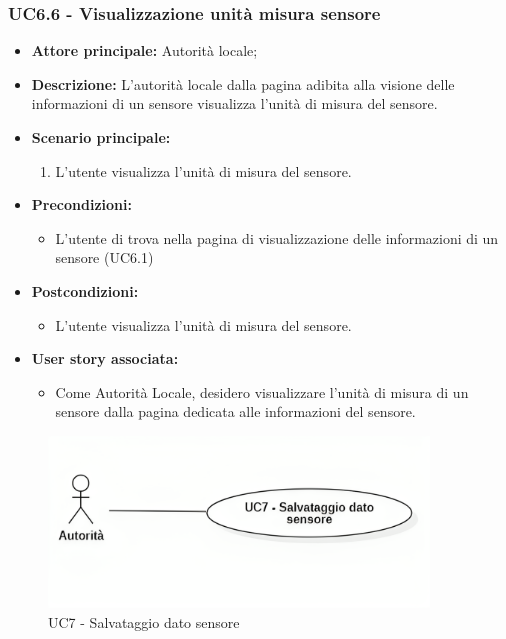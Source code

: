 \documentclass{article}
\begin{document}
\subsubsection{UC6.6 - Visualizzazione unità misura sensore}
\begin{itemize}
    \item \textbf{Attore principale:} Autorità locale;
    \item \textbf{Descrizione:} L’autorità locale dalla pagina adibita alla visione delle informazioni di un sensore visualizza l'unità di misura del sensore.
    \item \textbf{Scenario principale:}
          \begin{enumerate}
              \item L'utente visualizza l'unità di misura del sensore.
          \end{enumerate}
    \item \textbf{Precondizioni:}
          \begin{itemize}
              \item  L'utente di trova nella pagina di visualizzazione delle informazioni di un sensore (UC6.1)
          \end{itemize}
    \item \textbf{Postcondizioni:}
          \begin{itemize}
              \item  L'utente visualizza l'unità di misura del sensore.
          \end{itemize}
    \item \textbf{User story associata:}
          \begin{itemize}
              \item Come Autorità Locale, desidero visualizzare l'unità di misura di un sensore dalla pagina dedicata alle informazioni del sensore.
          \end{itemize}
\end{itemize}

\begin{figure}[H]
    \centering
    \includegraphics[width=0.9\textwidth]{Images/uc7.png}
    \caption{UC7 - Salvataggio dato sensore}
    \label{fig:UC7}
\end{figure}
\end{document}
